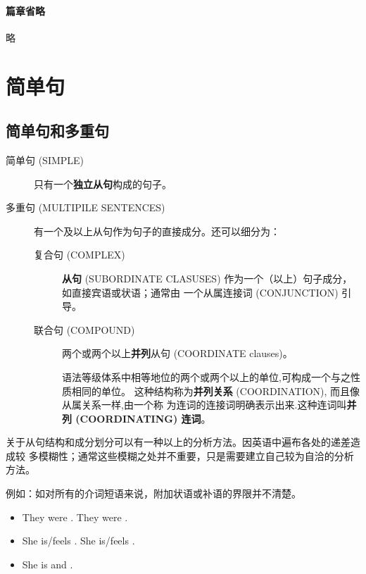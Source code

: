 \subsubsection{篇章省略}

略

\chapter{简单句}

\section{简单句和多重句}

\begin{description}
	\item[简单句 (SIMPLE)] 只有一个\textbf{独立从句}构成的句子。

\item[多重句 (MULTIPILE SENTENCES)] 有一个及以上从句作为句子的直接成分。还可以细分为：
  \begin{description}
  \item[复合句 (COMPLEX)]  \textbf{从句}
    (SUBORDINATE CLASUSES) 作为一个（以上）句子成分，如直接宾语或状语；通常由
    一个从属连接词 (CONJUNCTION) 引导。

  \item[联合句 (COMPOUND)] 两个或两个以上\textbf{并列}从句 (COORDINATE
    clauses)。 


    语法等级体系中相等地位的两个或两个以上的单位,可构成一个与之性质相同的单位。
    这种结构称为\textbf{并列关系} (COORDINATION), 而且像从属关系一样,由一个称
    为连词的连接词明确表示出来.这种连词叫\textbf{并列 (COORDINATING) 连词}。
  \end{description}
\end{description}



关于从句结构和成分划分可以有一种以上的分析方法。因英语中遍布各处的递差造成较
多模糊性；通常这些模糊之处并不重要，只是需要建立自己较为自洽的分析方法。


例如：如对所有的介词短语来说，附加状语或补语的界限并不清楚。
\begin{itemize}
\item They were . \qquad  They were .
\item She is/feels . \qquad  She is/feels .

\item She is  and .
\end{itemize}

